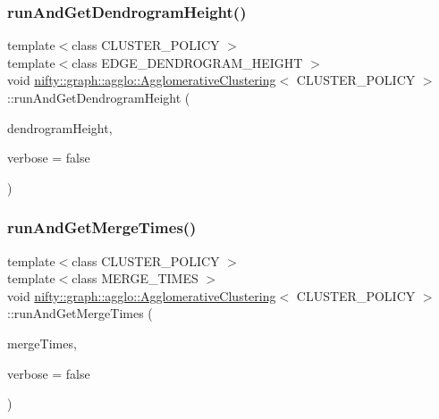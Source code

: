 \subsubsection{\texorpdfstring{run\+And\+Get\+Dendrogram\+Height()}{runAndGetDendrogramHeight()}}
{\footnotesize\ttfamily template$<$class C\+L\+U\+S\+T\+E\+R\+\_\+\+P\+O\+L\+I\+CY $>$ \\
template$<$class E\+D\+G\+E\+\_\+\+D\+E\+N\+D\+R\+O\+G\+R\+A\+M\+\_\+\+H\+E\+I\+G\+HT $>$ \\
void \hyperlink{classnifty_1_1graph_1_1agglo_1_1AgglomerativeClustering}{nifty\+::graph\+::agglo\+::\+Agglomerative\+Clustering}$<$ C\+L\+U\+S\+T\+E\+R\+\_\+\+P\+O\+L\+I\+CY $>$\+::run\+And\+Get\+Dendrogram\+Height (\begin{DoxyParamCaption}\item[{E\+D\+G\+E\+\_\+\+D\+E\+N\+D\+R\+O\+G\+R\+A\+M\+\_\+\+H\+E\+I\+G\+HT \&}]{dendrogram\+Height,  }\item[{const bool}]{verbose = {\ttfamily false} }\end{DoxyParamCaption})\hspace{0.3cm}{\ttfamily [inline]}}

\mbox{\label{classnifty_1_1graph_1_1agglo_1_1AgglomerativeClustering_a9c8d18e03cef48ba261ba8e8a1bcc924}} 
\subsubsection{\texorpdfstring{run\+And\+Get\+Merge\+Times()}{runAndGetMergeTimes()}}
{\footnotesize\ttfamily template$<$class C\+L\+U\+S\+T\+E\+R\+\_\+\+P\+O\+L\+I\+CY $>$ \\
template$<$class M\+E\+R\+G\+E\+\_\+\+T\+I\+M\+ES $>$ \\
void \hyperlink{classnifty_1_1graph_1_1agglo_1_1AgglomerativeClustering}{nifty\+::graph\+::agglo\+::\+Agglomerative\+Clustering}$<$ C\+L\+U\+S\+T\+E\+R\+\_\+\+P\+O\+L\+I\+CY $>$\+::run\+And\+Get\+Merge\+Times (\begin{DoxyParamCaption}\item[{M\+E\+R\+G\+E\+\_\+\+T\+I\+M\+ES \&}]{merge\+Times,  }\item[{const bool}]{verbose = {\ttfamily false} }\end{DoxyParamCaption})\hspace{0.3cm}{\ttfamily [inline]}}

